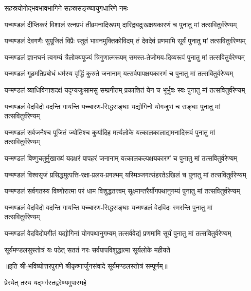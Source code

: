 {सहस्रयोगोद्भवभावभागिने सहस्रसङ्ख्यायुगधारिणे नमः}

\twolineshloka
{यन्मण्डलं दीप्तिकरं विशालं रत्नप्रभं तीव्रमनादिरूपम्}
{दारिद्र्यदुःखक्षयकारणं च पुनातु मां तत्सवितुर्वरेण्यम्}

\twolineshloka
{यन्मण्डलं देवगणैः सुपूजितं   विप्रैः स्तुतं भावनमुक्तिकोविदम्}
{तं देवदेवं प्रणमामि सूर्यं   पुनातु मां तत्सवितुर्वरेण्यम्}

\twolineshloka
{यन्मण्डलं ज्ञानघनं त्वगम्यं   त्रैलोक्यपूज्यं त्रिगुणात्मरूपम्}
{समस्त-तेजोमय-दिव्यरूपं   पुनातु मां तत्सवितुर्वरेण्यम्}

\twolineshloka
{यन्मण्डलं गूढमतिप्रबोधं   धर्मस्य वृद्धिं कुरुते जनानाम्}
{यत्सर्वपापक्षयकारणं च   पुनातु मां तत्सवितुर्वरेण्यम्}

\twolineshloka
{यन्मण्डलं व्याधिविनाशदक्षं   यदृग्यजुःसामसु सम्प्रगीतम्}
{प्रकाशितं येन च भूर्भुवः स्वः   पुनातु मां तत्सवितुर्वरेण्यम्}

\twolineshloka
{यन्मण्डलं वेदविदो वदन्ति   गायन्ति यच्चारण-सिद्धसङ्घाः}
{यद्योगिनो योगजुषां च सङ्घाः   पुनातु मां तत्सवितुर्वरेण्यम्}

\twolineshloka
{यन्मण्डलं सर्वजनैश्च पूजितं   ज्योतिश्च कुर्यादिह मर्त्यलोके}
{यत्कालकालाद्यमनादिरूपं   पुनातु मां तत्सवितुर्वरेण्यम्}

\twolineshloka
{यन्मण्डलं विष्णुचतुर्मुखाख्यं यदक्षरं पापहरं जनानाम्}
{यत्कालकल्पक्षयकारणं च   पुनातु मां तत्सवितुर्वरेण्यम्}

\twolineshloka
{यन्मण्डलं विश्वसृजं प्रसिद्धमुत्पत्ति-रक्षा-प्रलय-प्रगल्भम्}
{यस्मिञ्जगत्संहरतेऽखिलं च   पुनातु मां तत्सवितुर्वरेण्यम्}

\twolineshloka
{यन्मण्डलं सर्वगतस्य विष्णोरात्मा   परं धाम विशुद्धतत्त्वम्}
{सूक्ष्मान्तरैर्योगपथानुगम्यं   पुनातु मां तत्सवितुर्वरेण्यम्}

\twolineshloka
{यन्मण्डलं वेदविदो वदन्ति   गायन्ति यच्चारण-सिद्धसङ्घाः}
{यन्मण्डलं वेदविदः स्मरन्ति   पुनातु मां तत्सवितुर्वरेण्यम्}

\twolineshloka
{यन्मण्डलं वेदविदोपगीतं   यद्योगिनां योगपथानुगम्यम्}
{तत्सर्ववेद्यं  प्रणमामि सूर्यं   पुनातु मां तत्सवितुर्वरेण्यम्}

\twolineshloka
{सूर्यमण्डलसुस्तोत्रं यः पठेत् सततं नरः}
{सर्वपापविशुद्धात्मा  सूर्यलोके महीयते}

॥इति श्री-भविष्योत्तरपुराणे श्रीकृष्णार्जुनसंवादे सूर्यमण्डलस्तोत्रं सम्पूर्णम्॥
\closesection

{प्रेरयेत् तस्य यद्भर्गस्तद्वरेण्यमुपास्महे}

